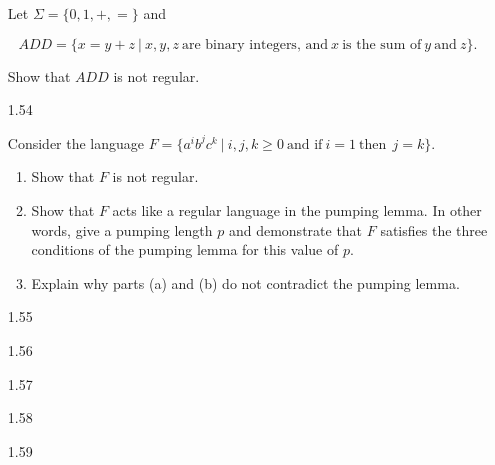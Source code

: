 \begin{enumerate}
            Let $\Sigma = \{0,1,+,=\}$ and 
            
            $$ADD = \{x=y+z~|~x,y,z~\text{are binary integers, and}~ x~ \text{is the sum of}~ y ~\text{and}~ z\}.$$
            
            Show that $ADD$ is not regular.
            
      \item [1.54]
            
            Consider the language $F = \{a^i b^j c^k ~|~ i,j,k \geq 0~ \text{and if}~ i=1~ \text{then}~~ j = k\}$. 
            \begin{enumerate}
                  \item Show that $F$ is not regular.
                  \item Show that $F$ acts like a regular language in the pumping lemma. In other words, give a pumping length $p$ and demonstrate that $F$ satisfies the three conditions of the pumping lemma for this value of $p$.
                  \item Explain why parts (a) and (b) do not contradict the pumping lemma.
                        
            \end{enumerate}
      \item [1.55]
            
            
      \item [1.56]
      \item [1.57]
      \item [1.58]
      \item [1.59]
            
\end{enumerate}
